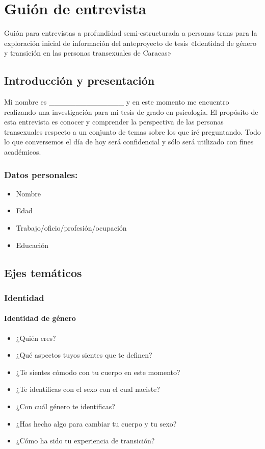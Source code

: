\chapter{Guión de entrevista}\label{guion}
Guión para entrevistas a profundidad semi-estructurada a personas trans
para la exploración inicial de información del anteproyecto de tesis
«Identidad de género y transición en las personas transexuales de
Caracas»

\section{Introducción y presentación}

Mi nombre es \_\_\_\_\_\_\_\_\_\_\_\_\_\_ y en este momento me encuentro
realizando una investigación para mi tesis de grado en psicología. El
propósito de esta entrevista es conocer y comprender la perspectiva de
las personas transexuales respecto a un conjunto de temas sobre los que
iré preguntando. Todo lo que conversemos el día de hoy será confidencial
y sólo será utilizado con fines académicos.

\subsection{Datos personales:}

\begin{itemize}
\item
  Nombre
\item
  Edad
\item
  Trabajo/oficio/profesión/ocupación
\item
  Educación
\end{itemize}

\section{Ejes temáticos}

	\subsection{Identidad}
	
		\subsubsection{Identidad de género}

\begin{itemize}
\item
  ¿Quién eres?
\item
  ¿Qué aspectos tuyos sientes que te definen?
\item
  ¿Te sientes cómodo con tu cuerpo en este momento?
\item
  ¿Te identificas con el sexo con el cual naciste?
\item
  ¿Con cuál género te identificas?
\item
  ¿Has hecho algo para cambiar tu cuerpo y tu sexo?
\item
  ¿Cómo ha sido tu experiencia de transición?
\end{itemize}

